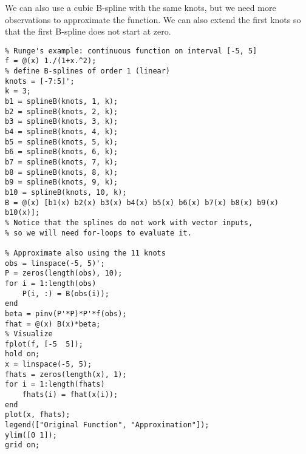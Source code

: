 \documentclass[12pt, a4paper]{article}
\begin{document}
We can also use a cubic B-spline with the same knots, but we need more observations to approximate the function.
We can also extend the first knots so that the first B-spline does not start at zero.
\lstset{language=matlab,label= ,caption= ,captionpos=b,firstnumber=1,numbers=left,style=Matlab-editor}
\begin{lstlisting}
% Runge's example: continuous function on interval [-5, 5]
f = @(x) 1./(1+x.^2);
% define B-splines of order 1 (linear)
knots = [-7:5]';
k = 3;
b1 = splineB(knots, 1, k);
b2 = splineB(knots, 2, k);
b3 = splineB(knots, 3, k);
b4 = splineB(knots, 4, k);
b5 = splineB(knots, 5, k);
b6 = splineB(knots, 6, k);
b7 = splineB(knots, 7, k);
b8 = splineB(knots, 8, k);
b9 = splineB(knots, 9, k);
b10 = splineB(knots, 10, k);
B = @(x) [b1(x) b2(x) b3(x) b4(x) b5(x) b6(x) b7(x) b8(x) b9(x) b10(x)];
% Notice that the splines do not work with vector inputs,
% so we will need for-loops to evaluate it.

% Approximate also using the 11 knots
obs = linspace(-5, 5)';
P = zeros(length(obs), 10);
for i = 1:length(obs)
    P(i, :) = B(obs(i));
end
beta = pinv(P'*P)*P'*f(obs);
fhat = @(x) B(x)*beta;
% Visualize
fplot(f, [-5  5]);
hold on;
x = linspace(-5, 5);
fhats = zeros(length(x), 1);
for i = 1:length(fhats)
    fhats(i) = fhat(x(i));
end
plot(x, fhats);
legend(["Original Function", "Approximation"]);
ylim([0 1]);
grid on;
\end{lstlisting}
\end{document}
